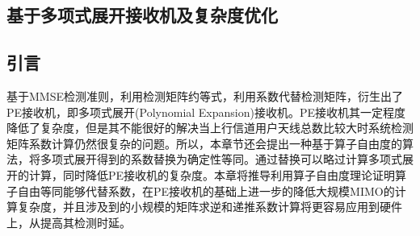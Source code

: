 \documentclass[bachelor,nocolorlinks, printoneside]{seuthesis} %
\begin{document}
\begin{Main}
\chapter{基于多项式展开接收机及复杂度优化}
\section{引言}
基于MMSE检测准则，利用检测矩阵约等式，利用系数代替检测矩阵，衍生出了PE接收机，即多项式展开(Polynomial Expansion)接收机。PE接收机其一定程度降低了复杂度，但是其不能很好的解决当上行信道用户天线总数比较大时系统检测矩阵系数计算仍然很复杂的问题。所以，本章节还会提出一种基于算子自由度的算法，将多项式展开得到的系数替换为确定性等同。通过替换可以略过计算多项式展开的计算，同时降低PE接收机的复杂度。本章将推导利用算子自由度理论证明算子自由等同能够代替系数，在PE接收机的基础上进一步的降低大规模MIMO的计算复杂度，并且涉及到的小规模的矩阵求逆和递推系数计算将更容易应用到硬件上，从提高其检测时延。

\end{Main}
\end{document}
